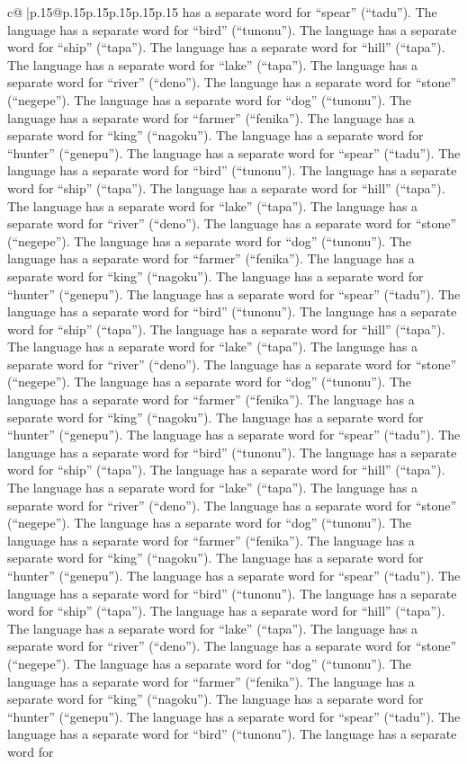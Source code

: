 \documentclass{article}
\begin{document}
{\begin{supertabular}{c@{$\;$}|p{.15\linewidth}@{}p{.15\linewidth}p{.15\linewidth}p{.15\linewidth}p{.15\linewidth}p{.15\linewidth}}
{{{has a separate word for “spear” (“tadu”). The language has a separate word for “bird” (“tunonu”). The language has a separate word for “ship” (“tapa”). The language has a separate word for “hill” (“tapa”). The language has a separate word for “lake” (“tapa”). The language has a separate word for “river” (“deno”). The language has a separate word for “stone” (“negepe”). The language has a separate word for “dog” (“tunonu”). The language has a separate word for “farmer” (“fenika”). The language has a separate word for “king” (“nagoku”). The language has a separate word for “hunter” (“genepu”). The language has a separate word for “spear” (“tadu”). The language has a separate word for “bird” (“tunonu”). The language has a separate word for “ship” (“tapa”). The language has a separate word for “hill” (“tapa”). The language has a separate word for “lake” (“tapa”). The language has a separate word for “river” (“deno”). The language has a separate word for “stone” (“negepe”). The language has a separate word for “dog” (“tunonu”). The language has a separate word for “farmer” (“fenika”). The language has a separate word for “king” (“nagoku”). The language has a separate word for “hunter” (“genepu”). The language has a separate word for “spear” (“tadu”). The language has a separate word for “bird” (“tunonu”). The language has a separate word for “ship” (“tapa”). The language has a separate word for “hill” (“tapa”). The language has a separate word for “lake” (“tapa”). The language has a separate word for “river” (“deno”). The language has a separate word for “stone” (“negepe”). The language has a separate word for “dog” (“tunonu”). The language has a separate word for “farmer” (“fenika”). The language has a separate word for “king” (“nagoku”). The language has a separate word for “hunter” (“genepu”). The language has a separate word for “spear” (“tadu”). The language has a separate word for “bird” (“tunonu”). The language has a separate word for “ship” (“tapa”). The language has a separate word for “hill” (“tapa”). The language has a separate word for “lake” (“tapa”). The language has a separate word for “river” (“deno”). The language has a separate word for “stone” (“negepe”). The language has a separate word for “dog” (“tunonu”). The language has a separate word for “farmer” (“fenika”). The language has a separate word for “king” (“nagoku”). The language has a separate word for “hunter” (“genepu”). The language has a separate word for “spear” (“tadu”). The language has a separate word for “bird” (“tunonu”). The language has a separate word for “ship” (“tapa”). The language has a separate word for “hill” (“tapa”). The language has a separate word for “lake” (“tapa”). The language has a separate word for “river” (“deno”). The language has a separate word for “stone” (“negepe”). The language has a separate word for “dog” (“tunonu”). The language has a separate word for “farmer” (“fenika”). The language has a separate word for “king” (“nagoku”). The language has a separate word for “hunter” (“genepu”). The language has a separate word for “spear” (“tadu”). The language has a separate word for “bird” (“tunonu”). The language has a separate word for }}}
\end{supertabular}}
\end{document}
